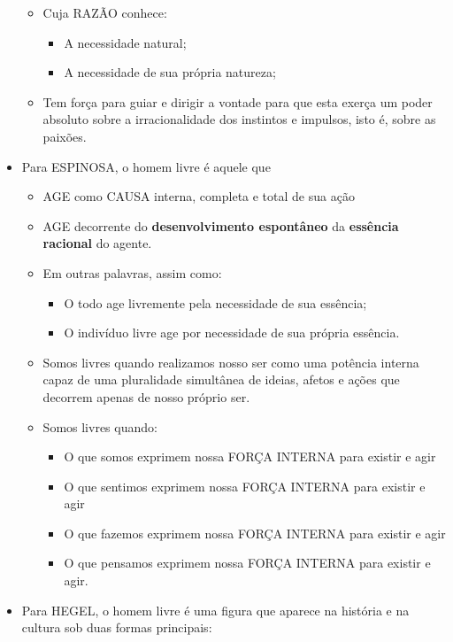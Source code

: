 \documentclass[
]{book}
\providecommand{\tightlist}{%
  \setlength{\itemsep}{0pt}\setlength{\parskip}{0pt}}
\begin{document}
\begin{itemize}
  \begin{itemize}
  \tightlist
  \item
    Cuja RAZÃO conhece:

    \begin{itemize}
    \tightlist
    \item
      A necessidade natural;
    \item
      A necessidade de sua própria natureza;
    \end{itemize}
  \item
    Tem força para guiar e dirigir a vontade para que esta exerça um
    poder absoluto sobre a irracionalidade dos instintos e impulsos,
    isto é, sobre as paixões.
  \end{itemize}
\item
  Para ESPINOSA, o homem livre é aquele que

  \begin{itemize}
  \tightlist
  \item
    AGE como CAUSA interna, completa e total de sua ação
  \item
    AGE decorrente do \textbf{desenvolvimento espontâneo} da
    \textbf{essência racional} do agente.
  \item
    Em outras palavras, assim como:

    \begin{itemize}
    \tightlist
    \item
      O todo age livremente pela necessidade de sua essência;
    \item
      O indivíduo livre age por necessidade de sua própria essência.
    \end{itemize}
  \item
    Somos livres quando realizamos nosso ser como uma potência interna
    capaz de uma pluralidade simultânea de ideias, afetos e ações que
    decorrem apenas de nosso próprio ser.
  \item
    Somos livres quando:

    \begin{itemize}
    \tightlist
    \item
      O que somos exprimem nossa FORÇA INTERNA para existir e agir
    \item
      O que sentimos exprimem nossa FORÇA INTERNA para existir e agir
    \item
      O que fazemos exprimem nossa FORÇA INTERNA para existir e agir
    \item
      O que pensamos exprimem nossa FORÇA INTERNA para existir e agir.
    \end{itemize}
  \end{itemize}
\item
  Para HEGEL, o homem livre é uma figura que aparece na história e na
  cultura sob duas formas principais:


\end{itemize}
\end{document}
